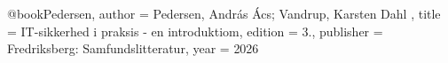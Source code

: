 @book{Pedersen,
    author = {{Pedersen, András Ács}; {Vandrup, Karsten Dahl}} ,
    title = {IT-sikkerhed i praksis - en introduktiom},
    edition = {3.},
    publisher = {Fredriksberg: Samfundslitteratur},
    year = {2026}
}